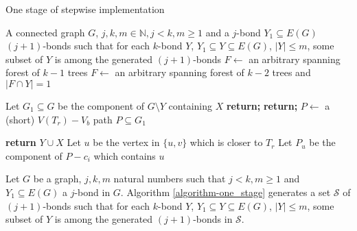 \begin{algorithm}
	\caption{One stage of stepwise implementation}
	\label{algorithm-one_stage}
\begin{algorithmic}[1]
	\Require A connected graph $G$, $j, k, m \in \mathbb{N}, j < k, m \geq 1$ and a $j$-bond $Y_1 \subseteq E(G)$
	\Ensure $(j+1)$-bonds such that for each $k$-bond $Y$, $Y_1 \subseteq Y \subseteq E(G)$, $\lvert Y \rvert \leq m$, some subset of $Y$ is among the generated $(j+1)$-bonds
	 
		\State $F \leftarrow$ an arbitrary spanning forest of $k-1$ trees
		\Else {}
		\State $F \leftarrow$ an arbitrary spanning forest of $k-2$ trees and $\lvert F \cap Y\rvert = 1$
	\EndIf
		\State {}
	\EndFor

	\State Let $G_1 \subseteq G$ be the component of $G \setminus Y$ containing $X$
		\State \textbf{return;} 
	\EndIf
		\State \textbf{return;}
	\EndIf
	\State $P \leftarrow$ a (short) $V(T_r){-}V_b$ path $P \subseteq G_1$

		\State \textbf{return} $Y \cup X$ 
	\Else
			\State Let $u$ be the vertex in $\{u,v\}$ which is closer to $T_r$
			\State Let $P_u$ be the component of $P - c_i$ which contains $u$
			\State {}
		\EndFor
	\EndIf

	\EndProcedure
\end{algorithmic}
\end{algorithm}

\clearpage

\begin{thm}
	Let $G$ be a graph, $j,k,m$ natural numbers such that $j < k, m \geq 1$ and $Y_1 \subseteq E(G)$ a $j$-bond in $G$. Algorithm \ref{algorithm-one_stage} generates a set $\mathcal{S}$ of $(j+1)$-bonds such that for each $k$-bond $Y$, $Y_1 \subseteq Y \subseteq E(G)$, $\lvert Y \rvert \leq m$, some subset of $Y$ is among the generated $(j+1)$-bonds in $\mathcal{S}$.
\end{thm}

